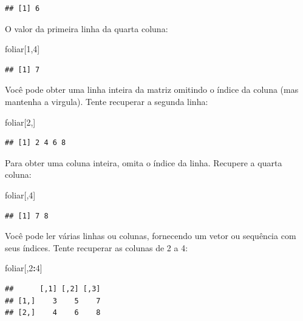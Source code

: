 \documentclass[
]{book}
\newenvironment{Shaded}{\begin{snugshade}}{\end{snugshade}}
\newcommand{\DecValTok}[1]{\textcolor[rgb]{0.00,0.00,0.81}{#1}}
\newcommand{\NormalTok}[1]{#1}
\newcommand{\OperatorTok}[1]{\textcolor[rgb]{0.81,0.36,0.00}{\textbf{#1}}}
\begin{document}
\begin{verbatim}
## [1] 6
\end{verbatim}

O valor da primeira linha da quarta coluna:

\begin{Shaded}
\begin{Highlighting}[]
\NormalTok{foliar[}\DecValTok{1}\NormalTok{,}\DecValTok{4}\NormalTok{]}
\end{Highlighting}
\end{Shaded}

\begin{verbatim}
## [1] 7
\end{verbatim}

Você pode obter uma linha inteira da matriz omitindo o índice da coluna (mas mantenha a virgula). Tente recuperar a segunda linha:

\begin{Shaded}
\begin{Highlighting}[]
\NormalTok{foliar[}\DecValTok{2}\NormalTok{,]}
\end{Highlighting}
\end{Shaded}

\begin{verbatim}
## [1] 2 4 6 8
\end{verbatim}

Para obter uma coluna inteira, omita o índice da linha. Recupere a quarta coluna:

\begin{Shaded}
\begin{Highlighting}[]
\NormalTok{foliar[,}\DecValTok{4}\NormalTok{]}
\end{Highlighting}
\end{Shaded}

\begin{verbatim}
## [1] 7 8
\end{verbatim}

Você pode ler várias linhas ou colunas, fornecendo um vetor ou sequência com seus índices. Tente recuperar as colunas de 2 a 4:

\begin{Shaded}
\begin{Highlighting}[]
\NormalTok{foliar[,}\DecValTok{2}\OperatorTok{:}\DecValTok{4}\NormalTok{]}
\end{Highlighting}
\end{Shaded}

\begin{verbatim}
##      [,1] [,2] [,3]
## [1,]    3    5    7
## [2,]    4    6    8
\end{verbatim}
\end{document}
